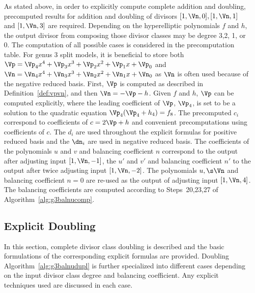 As stated above, in order to explicitly compute complete addition and doubling,
precomputed results for addition and doubling of divisors $[1,\Vn,0], [1,\Vn,1]$
and $[1,\Vn,3]$ are required. Depending on the hyperelliptic polynomials $f$ and
$h$, the output divisor from composing those divisor classes may be degree 3,2,
1, or 0. The computation of all possible cases is considered in the
precomputation table. For genus 3 split models, it is beneficial to store both
$\Vp = \Vp_4x^4 + \Vp_3x^3 + \Vp_2x^2 + \Vp_1x + \Vp_0$ and  $\Vn = \Vn_4x^4 +
\Vn_3x^3 + \Vn_2x^2 + \Vn_1x + \Vn_0$ as $\Vn$ is often used because of the
negative reduced basis. First, $\Vp$ is computed as described in
Definition~\ref{def:vpvn}, and then $\Vn = - \Vp - h$. Given $f$ and $h$, $\Vp$
can be computed explicitly, where the leading coefficient of $\Vp$, $\Vp_4$, is
set to be a solution to the quadratic equation $\Vp_4(\Vp_4 + h_4) = f_8$. The
precomputed $c_i$ correspond to coefficients of $c = 2\Vp + h$ and convenient
precomputations using coefficients of $c$. The $d_i$ are used throughout the
explicit formulas for positive reduced basis and the $\dn_i$ are used in
negative reduced basis. The coefficients of the polynomials $u$ and $v$ and
balancing coefficient $n$ correspond to the output after adjusting input
$[1,\Vn,-1]$, the $u'$ and $v'$ and balancing coefficient $n'$ to the output
after twice adjusting input $[1,\Vn,-2]$. The polynomials $u, \s \Vn$ and
balancing coefficient $n=0$ are re-used as the output of adjusting input
$[1,\Vn,4]$. The balancing coefficients are computed according to Steps~20,23,27
of Algorithm~\ref{alg:g3balnucomp}.

\subsection{Explicit Doubling}\label{sec:g3SPLITDBL}
In this section, complete divisor class doubling is described and the basic
formulations of the corresponding explicit formulas are provided. Doubling
Algorithm~\ref{alg:g3balnudupl} is further specialized into different cases
depending on the input divisor class degree and balancing coefficient. Any
explicit techniques used are discussed in each case. 

